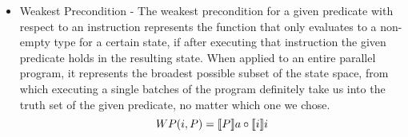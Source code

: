 \begin{itemize}
    \item Weakest Precondition - The weakest precondition for a given predicate with respect to an instruction represents the function that only evaluates to a non-empty type for a certain state, if after executing that instruction the given predicate holds in the resulting state.
    When applied to an entire parallel program, it represents the broadest possible subset of the state space, from which executing a single batches of the program definitely take us into the truth set of the given predicate, no matter which one we chose.
    \begin{equation}
        WP(i , P) = \llbracket P \rrbracket a \circ \llbracket i \rrbracket i
    \end{equation}
    \begin{code}
        \>[2]\AgdaSpace{}%
        \AgdaSymbol{:}\AgdaSpace{}%
        \AgdaSymbol{(}\AgdaSpace{}%
        \AgdaSpace{}%
        \AgdaSymbol{)}\AgdaSpace{}%
        \AgdaSpace{}%
        \<%
        \\
        \>[2]\AgdaSpace{}%
        \AgdaSymbol{(}\AgdaSpace{}%
        \AgdaOperator{\AgdaInductiveConstructor{,}}\AgdaSpace{}%
        \AgdaSymbol{)}\AgdaSpace{}%
        \AgdaSymbol{=}\AgdaSpace{}%
        \AgdaSpace{}%
        \AgdaSpace{}%
        \AgdaSpace{}%
        \AgdaSymbol{(}\AgdaSpace{}%
        \AgdaSpace{}%
        \AgdaSpace{}%
        \AgdaSymbol{)}\AgdaSpace{}%
        \AgdaSpace{}%
        \<%
        \\
        \\[\AgdaEmptyExtraSkip]%
        \>[2]\AgdaSpace{}%
        \AgdaSymbol{:}\AgdaSpace{}%
        \AgdaSymbol{(}\AgdaSpace{}%
        \AgdaSpace{}%
        \AgdaSymbol{)}\AgdaSpace{}%
        \AgdaSpace{}%
        \<%
        \\
        \>[2]\AgdaSpace{}%
        \AgdaSymbol{(}\AgdaSpace{}%
        \AgdaOperator{\AgdaInductiveConstructor{,}}\AgdaSpace{}%
        \AgdaSymbol{)}\AgdaSpace{}%

\end{code}
\end{itemize}
